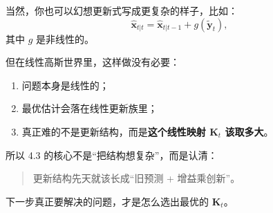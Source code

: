 当然，你也可以幻想更新式写成更复杂的样子，比如：
\[
\hat{\bm{x}}_{t|t}
= \hat{\bm{x}}_{t|t-1} + g(\tilde{\bm{y}}_t),
\]
其中
\(g\)
是非线性的。

但在线性高斯世界里，这样做没有必要：
\begin{enumerate}
  \item 问题本身是线性的；
  \item 最优估计会落在线性更新族里；
  \item 真正难的不是更新结构，而是\textbf{这个线性映射
  \(\bm{K}_t\)
  该取多大}。
\end{enumerate}

所以 4.3 的核心不是“把结构想复杂”，而是认清：
\begin{quote}
更新结构先天就该长成“旧预测 + 增益乘创新”。
\end{quote}

下一步真正要解决的问题，才是怎么选出最优的
\(\bm{K}_t\)。

